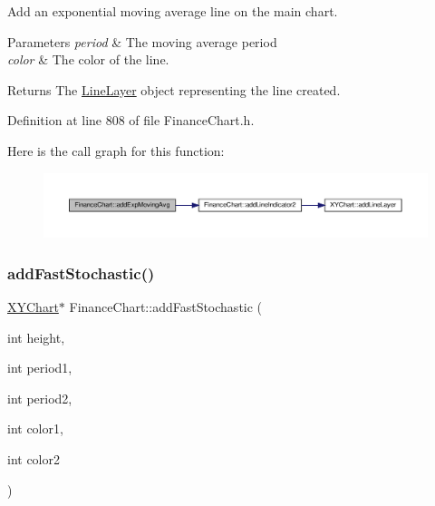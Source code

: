 Add an exponential moving average line on the main chart. 


\begin{DoxyParams}{Parameters}
{\em period} & The moving average period\\
\hline
{\em color} & The color of the line.\\
\hline
\end{DoxyParams}
\begin{DoxyReturn}{Returns}
The \hyperlink{class_line_layer}{Line\+Layer} object representing the line created.
\end{DoxyReturn}


Definition at line 808 of file Finance\+Chart.\+h.

Here is the call graph for this function\+:
\nopagebreak
\begin{figure}[H]
\begin{center}
\leavevmode
\includegraphics[width=350pt]{class_finance_chart_a54fbce37c95280f028de248eb6681ea0_cgraph}
\end{center}
\end{figure}
\mbox{\label{class_finance_chart_aaf35dc123849c0ad4a959f2e1667360c}} 
\subsubsection{\texorpdfstring{add\+Fast\+Stochastic()}{addFastStochastic()}}
{\footnotesize\ttfamily \hyperlink{class_x_y_chart}{X\+Y\+Chart}$\ast$ Finance\+Chart\+::add\+Fast\+Stochastic (\begin{DoxyParamCaption}\item[{int}]{height,  }\item[{int}]{period1,  }\item[{int}]{period2,  }\item[{int}]{color1,  }\item[{int}]{color2 }\end{DoxyParamCaption})\hspace{0.3cm}{\ttfamily [inline]}}



